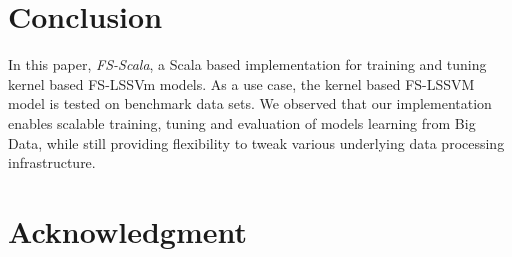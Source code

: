 \documentclass[conference, cmex10]{IEEEtran}
\begin{document}
\section{Conclusion} \label{Conclusion}

In this paper, \textit{FS-Scala}, a Scala based implementation for training and tuning kernel based FS-LSSVm models. As a use case, the kernel based FS-LSSVM model is tested on benchmark data sets. We observed that our implementation enables scalable training, tuning and evaluation of models learning from Big Data, while still providing flexibility to tweak various underlying data processing infrastructure.




%


\appendices
\section*{Acknowledgment}



\ifCLASSOPTIONcaptionsoff
  \newpage
\fi
\end{document}
